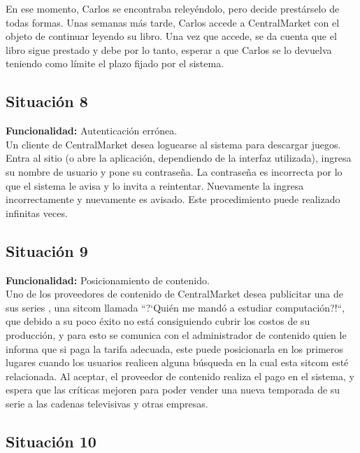 \documentclass[11pt, a4paper, spanish]{article}
\begin{document}
        En ese momento, Carlos se encontraba reley\'endolo, pero decide prest\'arselo de todas formas. Unas semanas m\'as tarde, Carlos accede a  CentralMarket con el objeto de continuar leyendo su libro. Una vez que accede, se da cuenta que el libro sigue prestado y debe por lo tanto, esperar a que Carlos se lo devuelva teniendo como l\'imite el plazo fijado por el sistema. 

\subsection{Situaci\'on 8}

	\textbf{Funcionalidad:} Autenticaci\'on err\'onea.\\

	Un cliente de CentralMarket desea loguearse al sistema para descargar juegos. Entra al sitio (o abre la aplicaci\'on, dependiendo de la interfaz 
   utilizada), ingresa su nombre de usuario y pone su contrase\~{n}a. La contrase\~{n}a es incorrecta por lo que el sistema le avisa y lo invita a reintentar. 
   Nuevamente la ingresa incorrectamente y nuevamente es avisado.
   Este procedimiento puede realizado infinitas veces.

\subsection{Situaci\'on 9}

	\textbf{Funcionalidad:} Posicionamiento de contenido.\\

	Uno de los proveedores de contenido de CentralMarket desea publicitar una de sus series , una sitcom llamada ``?`Qui\'en me mand\'o a estudiar    
   computaci\'on?!``, que debido a su poco \'exito no est\'a consiguiendo cubrir los costos de su producci\'on, y para esto se comunica con el administrador de 
   contenido quien le informa que si paga la tarifa adecuada, este puede posicionarla en los primeros lugares cuando los usuarios realicen alguna    
   b\'usqueda en la cual esta sitcom est\'e relacionada. Al aceptar, el proveedor de contenido realiza el pago en el sistema, y espera que las cr\'iticas    
   mejoren para poder vender una nueva temporada de su serie a las cadenas televisivas y otras empresas. 


\subsection{Situaci\'on 10}
\end{document}
